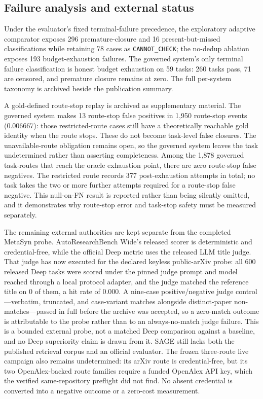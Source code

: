 \subsection{Failure analysis and external status}
Under the evaluator's fixed terminal-failure precedence, the exploratory
adaptive comparator exposes 296 premature-closure and 16 present-but-missed
classifications while retaining 78 cases as \texttt{CANNOT\_CHECK}; the no-dedup ablation
exposes 193 budget-exhaustion failures.  The governed system's only terminal
failure classification is honest budget exhaustion on 59 tasks: 260 tasks pass,
71 are censored, and premature closure remains at zero.
The full per-system taxonomy is archived beside the publication summary.

A gold-defined route-stop replay is archived as supplementary material.
The governed system makes 13 route-stop false positives in 1,950 route-stop events
(0.006667): those restricted-route cases still have a theoretically reachable
gold identity when the route stops.  These do not become
task-level false closures.  The unavailable-route obligation remains open, so
the governed system leaves the task undetermined rather than asserting completeness.
Among the 1,878 governed task-routes that reach the oracle exhaustion point, there
are zero route-stop false negatives.  The restricted route records 377
post-exhaustion attempts in total; no task takes the two or more further
attempts required for a route-stop false negative.  This null-on-FN result is reported rather than being
silently omitted, and it demonstrates why route-stop error and task-stop safety
must be measured separately.

The remaining external authorities are kept separate from the completed MetaSyn
probe.  AutoResearchBench Wide's released scorer is deterministic and
credential-free, while the official Deep metric uses the released LLM title
judge.  That judge has now executed for the declared keyless public-arXiv
probe: all 600 released Deep tasks were scored under the pinned judge prompt
and model reached through a local protocol adapter, and the judge matched the
reference title on 0 of them, a hit rate of 0.000.  A nine-case
positive/negative judge control---verbatim, truncated, and case-variant
matches alongside distinct-paper non-matches---passed in full before the
archive was accepted, so a zero-match outcome is attributable to the probe
rather than to an always-no-match judge failure.  This is a bounded external
probe, not a matched Deep comparison against a baseline, and no Deep
superiority claim is drawn from it.  SAGE still lacks both the published
retrieval corpus and an official evaluator.  The frozen three-route live
campaign also remains undetermined: its arXiv route is credential-free,
but its two OpenAlex-backed route families require a funded OpenAlex API key,
which the verified same-repository preflight did not
find.  No absent credential is converted into a negative outcome or a zero-cost
measurement.

